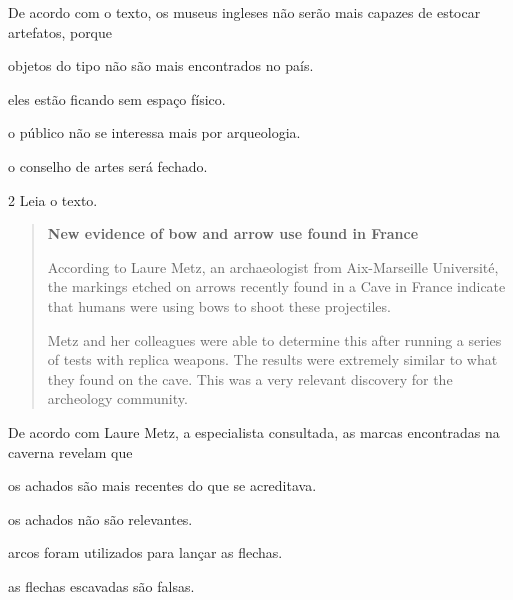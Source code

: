 De acordo com o texto, os museus ingleses não serão mais capazes de
estocar artefatos, porque

\begin{escolha}
\item objetos do tipo não são mais encontrados no país.

\item eles estão ficando sem espaço físico.

\item o público não se interessa mais por arqueologia.

\item o conselho de artes será fechado.
\end{escolha}

\num{2} Leia o texto.

\begin{quote}
\textbf{New evidence of bow and arrow use found in France}

According to Laure Metz, an archaeologist from Aix-Marseille Université, the markings etched on arrows recently found in a Cave in France indicate that humans were using bows to shoot these projectiles.

Metz and her colleagues were able to determine this after running a series of tests with replica weapons. The results were extremely similar to what they found on the cave. This was a very relevant discovery for the archeology community.   

\end{quote}

De acordo com Laure Metz, a especialista consultada, as marcas encontradas na caverna revelam que

\begin{escolha}
\item os achados são mais recentes do que se acreditava.

\item os achados não são relevantes.

\item arcos foram utilizados para lançar as flechas.

\item as flechas escavadas são falsas.
\end{escolha}

